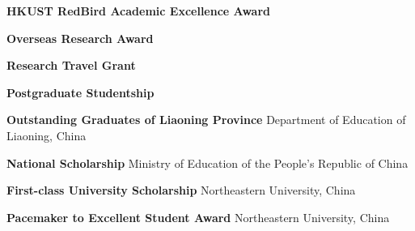 %
%
%


\begin{scholarship}
	{\textbf{HKUST RedBird Academic Excellence Award}}

	{\textbf{Overseas Research Award}}

	{\textbf{Research Travel Grant}}

	{\textbf{Postgraduate Studentship}}

	{\textbf{Outstanding Graduates of Liaoning Province}}
	\scholarshipentry{}
	{Department of Education of Liaoning, China}

	{\textbf{National Scholarship}}
	\scholarshipentry{}
	{Ministry of Education of the People's Republic of China}

	{\textbf{First-class University Scholarship}}
	\scholarshipentry{}
	{Northeastern University, China}

	{\textbf{Pacemaker to Excellent Student Award}}
	\scholarshipentry{}
	{Northeastern University, China}

\end{scholarship}
